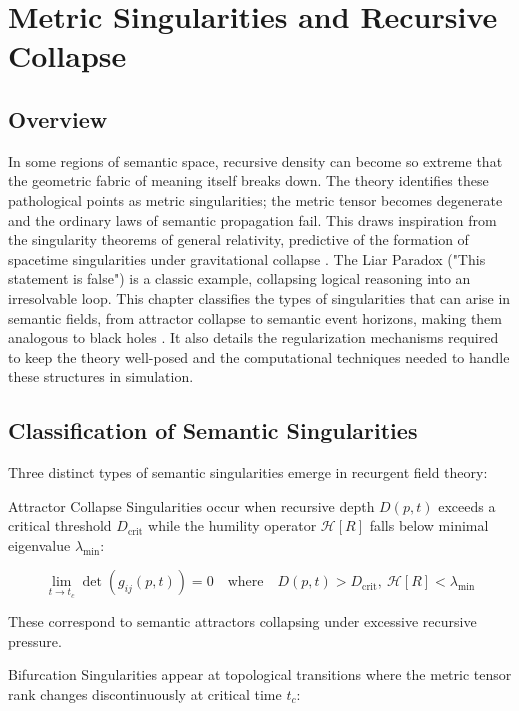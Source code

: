\chapter{Metric Singularities and Recursive Collapse}

\section{Overview}

In some regions of semantic space, recursive density can become so extreme that the geometric fabric of meaning itself breaks down. The theory identifies these pathological points as metric singularities; the metric tensor becomes degenerate and the ordinary laws of semantic propagation fail. This draws inspiration from the singularity theorems of general relativity, predictive of the formation of spacetime singularities under gravitational collapse \autocite{Penrose1965}. The Liar Paradox ("This statement is false") is a classic example, collapsing logical reasoning into an irresolvable loop. This chapter classifies the types of singularities that can arise in semantic fields, from attractor collapse to semantic event horizons, making them analogous to black holes \autocite{Hawking1974}. It also details the regularization mechanisms required to keep the theory well-posed and the computational techniques needed to handle these structures in simulation.

\section{Classification of Semantic Singularities}

Three distinct types of semantic singularities emerge in recurgent field theory:

Attractor Collapse Singularities occur when recursive depth \(D(p, t)\) exceeds a critical threshold \(D_{\text{crit}}\) while the humility operator \(\mathcal{H}[R]\) falls below minimal eigenvalue \(\lambda_{\text{min}}\):

\begin{equation}
\lim_{t \to t_c} \det(g_{ij}(p, t)) = 0 \quad \text{where} \quad D(p, t) > D_{\text{crit}},\ \mathcal{H}[R] < \lambda_{\text{min}}
\end{equation}

These correspond to semantic attractors collapsing under excessive recursive pressure.

Bifurcation Singularities appear at topological transitions where the metric tensor rank changes discontinuously at critical time \(t_c\):


